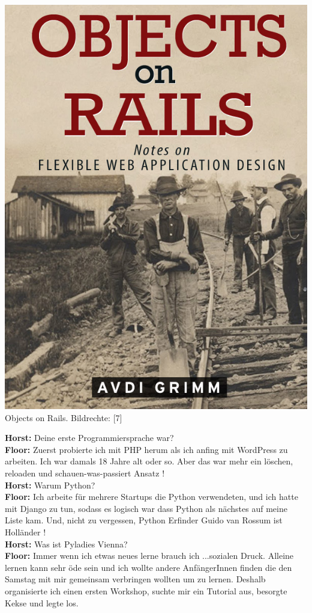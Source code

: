 \begin{center}
\includegraphics[width=\linewidth]{floor/floor-rails.jpg} \\
\footnotesize{Objects on Rails. Bildrechte: [7]} 
\end{center}
\textbf{Horst:} Deine erste Programmiersprache war? \\
\textbf{Floor:} Zuerst probierte ich mit PHP herum als ich anfing mit WordPress zu arbeiten. Ich war damals 18 Jahre alt oder so. Aber das war mehr ein löschen, reloaden und schauen-was-passiert Ansatz ! \\
\textbf{Horst:} Warum Python? \\
\textbf{Floor:} Ich arbeite für mehrere Startups die Python verwendeten, und ich hatte mit Django zu tun, sodass es logisch war dass Python als nächstes auf meine Liste kam. Und, nicht zu vergessen, Python Erfinder Guido van Rossum ist Holländer ! \\
\textbf{Horst:} Was ist Pyladies Vienna? \\
\textbf{Floor:} Immer wenn ich etwas neues lerne brauch ich ...sozialen Druck. Alleine lernen kann sehr öde sein und ich wollte andere AnfängerInnen finden die den Samstag mit mir gemeinsam verbringen wollten um zu lernen. Deshalb organisierte ich einen ersten Workshop, suchte mir ein Tutorial aus, besorgte Kekse und legte los.

